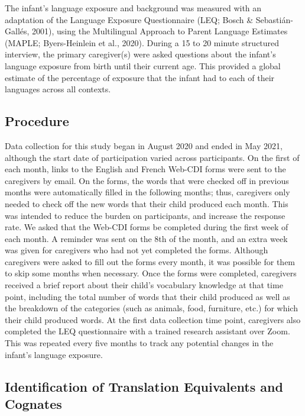 \documentclass[
  english,
  ,man,floatsintext]{apa6}
\begin{document}
The infant's language exposure and background was measured with an adaptation of the Language Exposure Questionnaire (LEQ; Bosch \& Sebastián-Gallés, 2001), using the Multilingual Approach to Parent Language Estimates (MAPLE; Byers-Heinlein et al., 2020). During a 15 to 20 minute structured interview, the primary caregiver(s) were asked questions about the infant's language exposure from birth until their current age. This provided a global estimate of the percentage of exposure that the infant had to each of their languages across all contexts.

\hypertarget{procedure}{%
\subsection{Procedure}\label{procedure}}

Data collection for this study began in August 2020 and ended in May 2021, although the start date of participation varied across participants. On the first of each month, links to the English and French Web-CDI forms were sent to the caregivers by email. On the forms, the words that were checked off in previous months were automatically filled in the following months; thus, caregivers only needed to check off the new words that their child produced each month. This was intended to reduce the burden on participants, and increase the response rate. We asked that the Web-CDI forms be completed during the first week of each month. A reminder was sent on the 8th of the month, and an extra week was given for caregivers who had not yet completed the forms. Although caregivers were asked to fill out the forms every month, it was possible for them to skip some months when necessary. Once the forms were completed, caregivers received a brief report about their child's vocabulary knowledge at that time point, including the total number of words that their child produced as well as the breakdown of the categories (such as animals, food, furniture, etc.) for which their child produced words.
At the first data collection time point, caregivers also completed the LEQ questionnaire with a trained research assistant over Zoom. This was repeated every five months to track any potential changes in the infant's language exposure.

\hypertarget{identification-of-translation-equivalents-and-cognates}{%
\subsection{Identification of Translation Equivalents and Cognates}\label{identification-of-translation-equivalents-and-cognates}}
\end{document}
